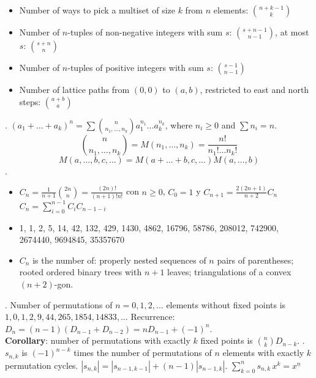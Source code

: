\begin{itemize}
    \item Number of ways to pick a multiset of size $k$ from $n$ elements: ${n+k-1 \choose k}$
    \item Number of $n$-tuples of non-negative integers with sum $s$: ${{s+n-1} \choose {n-1}}$, at most $s$: ${{s + n} \choose {n}}$
    \item Number of $n$-tuples of positive integers with sum $s$: ${{s-1} \choose {n-1}}$
    \item Number of lattice paths from $(0,0)$ to $(a,b)$, restricted to east and north steps: ${a+b \choose a}$
\end{itemize}
.
$(a_1+\dots+a_k)^n = \sum {n \choose n_1,\dots,n_k} a_1^{n_1} \dots a_k^{n_k}$,
where $n_i \ge 0$ and $\sum n_i=n$. \\
$${n \choose n_1,\dots,n_k} = M(n_1,\dots,n_k) = \frac{n!}{n_1! \dots n_k!}$$
$$M(a,\dots,b,c,\dots) = M(a+\dots+b,c,\dots) M(a,\dots,b)$$
.
\begin{itemize}
    \item $C_n = \frac{1}{n+1} \binom{2n}{n} = \frac{(2n)!}{(n+1)!n!}$ con $n \geq 0$, $C_0 = 1$ y $C_{n+1} = \frac{2(2n + 1)}{n + 2} C_{n}$
$C_n=\sum_{i=0}^{n-1} C_i C_{n-1-i}$    
\item 1, 1, 2, 5, 14, 42, 132, 429, 1430, 4862, 16796, 58786, 208012, 742900, 2674440, 9694845, 35357670
 \item $C_n$ is the number of:
properly nested sequences of $n$ pairs of parentheses;
rooted ordered binary trees with $n+1$ leaves;
triangulations of a convex $(n+2)$-gon.

\end{itemize}
{}.
Number of permutations of $n=0,1,2,\dots$ elements without fixed points is
$1, 0, 1, 2, 9, 44, 265, 1854, 14833, \dots$
Recurrence: $D_n = (n-1)(D_{n-1} + D_{n-2}) = n D_{n-1} + (-1)^n$. \\
\textbf{Corollary}: number of permutations with exactly $k$ fixed points is ${n \choose k} D_{n-k}$. \TopicBreak
{}.
$s_{n,k}$ is $(-1)^{n-k}$ times the number of permutations of $n$ elements with
exactly $k$ permutation cycles.
$|s_{n,k}| = |s_{n-1,k-1}| + (n-1) |s_{n-1,k}|$. \quad
$\sum_{k=0}^n s_{n,k}\,x^k = x^{\underline n}$ \\
